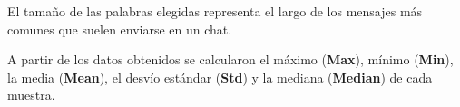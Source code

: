 El tamaño de las palabras elegidas representa el largo de los mensajes más comunes que suelen enviarse en un chat.

A partir de los datos obtenidos se calcularon el máximo (\textbf{Max}), mínimo (\textbf{Min}), la media (\textbf{Mean}), el desvío estándar (\textbf{Std}) y la mediana (\textbf{Median}) de cada muestra.